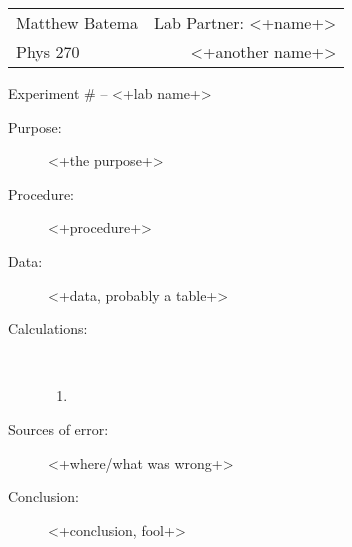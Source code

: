 \documentclass[12pt,letterpaper]{article}
\begin{document}
\begin{center}
\begin{tabular*}{\textwidth}{@{\extracolsep{\fill}}lr}
Matthew Batema	&	Lab Partner: <+name+> \\
Phys 270	&	<+another name+>\\
\end{tabular*}
\end{center}

Experiment \#<+lab number+> -- <+lab name+>

\begin{description}
\item[Purpose:]
<+the purpose+>
\item[Procedure:]
<+procedure+>
\item[Data:]
<+data, probably a table+>
\item[Calculations:]\ %
\begin{enumerate}
\item	<+step one+>
\end{enumerate}
\item[Sources of error:]
<+where/what was wrong+>
\item[Conclusion:]
<+conclusion, fool+>
\end{description}
\end{document}
